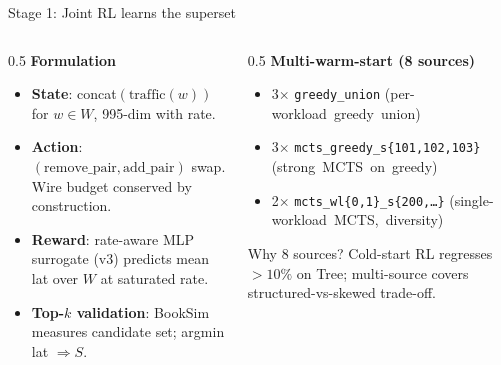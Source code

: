 \documentclass[aspectratio=169]{beamer}
\begin{document}
\begin{frame}{Stage 1: Joint RL learns the superset}
\begin{columns}[T]
\begin{column}{0.5\textwidth}
\textbf{Formulation}
\begin{itemize}\small
  \item \textbf{State}: concat$(\text{traffic}(w))$ for $w \in W$,
        995-dim with rate.
  \item \textbf{Action}: $(\text{remove\_pair}, \text{add\_pair})$ swap.
        Wire budget conserved by construction.
  \item \textbf{Reward}: rate-aware MLP surrogate (v3) predicts
        mean lat over $W$ at saturated rate.
  \item \textbf{Top-$k$ validation}: BookSim measures candidate set;
        argmin lat $\Rightarrow S$.
\end{itemize}
\end{column}
\begin{column}{0.5\textwidth}
\textbf{Multi-warm-start (8 sources)}
\begin{itemize}\small
  \item 3$\times$ \texttt{greedy\_union} \mbox{(per-workload greedy union)}
  \item 3$\times$ \texttt{mcts\_greedy\_s\{101,102,103\}}
        \mbox{(strong MCTS on greedy)}
  \item 2$\times$ \texttt{mcts\_wl\{0,1\}\_s\{200,\ldots\}}
        \mbox{(single-workload MCTS, diversity)}
\end{itemize}
\vspace{0.5em}
\alert{Why 8 sources?} Cold-start RL regresses $>10\%$ on Tree;
multi-source covers structured-vs-skewed trade-off.
\end{column}
\end{columns}
\end{frame}
\end{document}
